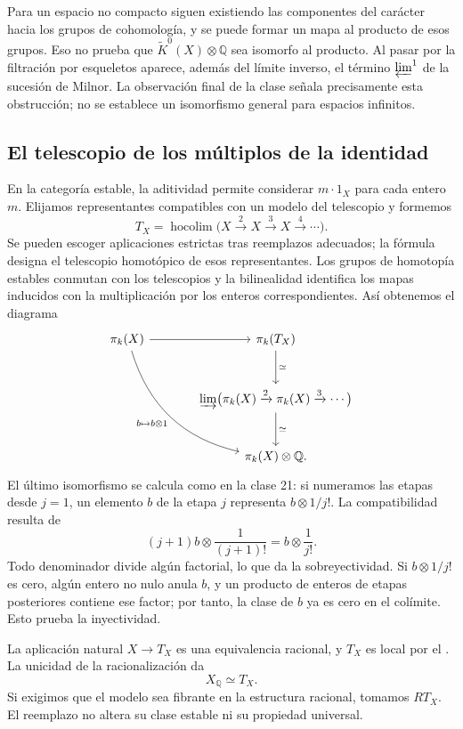 Para un espacio no compacto siguen existiendo las componentes del carácter hacia los grupos de cohomología, y se puede formar un mapa al producto de esos grupos. Eso no prueba que $\widetilde K^0(X)\otimes\mathbb Q$ sea isomorfo al producto. Al pasar por la filtración por esqueletos aparece, además del límite inverso, el término $\varprojlim^1$ de la sucesión de Milnor. La observación final de la clase señala precisamente esta obstrucción; no se establece un isomorfismo general para espacios infinitos.

\subsection{El telescopio de los múltiplos de la identidad}
En la categoría estable, la aditividad permite considerar $m\cdot1_X$ para cada entero $m$. Elijamos representantes compatibles con un modelo del telescopio y formemos
\[
T_X=\operatorname*{hocolim}\bigl(X\xrightarrow{\ 2\ }X
\xrightarrow{\ 3\ }X\xrightarrow{\ 4\ }\cdots\bigr).
\]
Se pueden escoger aplicaciones estrictas tras reemplazos adecuados; la fórmula designa el telescopio homotópico de esos representantes. Los grupos de homotopía estables conmutan con los telescopios y la bilinealidad identifica los mapas inducidos con la multiplicación por los enteros correspondientes. Así obtenemos el diagrama
\[
\begin{tikzcd}[column sep=large,row sep=large]
\pi_k(X)\arrow[r]\arrow[ddr,bend right=30,"b\mapsto b\otimes1"']
&\pi_k(T_X)\arrow[d,"\simeq"]\\
&\displaystyle\varinjlim\bigl(\pi_k(X)\xrightarrow{2}\pi_k(X)
\xrightarrow{3}\cdots\bigr)\arrow[d,"\simeq"]\\
&\pi_k(X)\otimes\mathbb Q.
\end{tikzcd}
\]
El último isomorfismo se calcula como en la clase 21: si numeramos las etapas desde $j=1$, un elemento $b$ de la etapa $j$ representa $b\otimes1/j!$. La compatibilidad resulta de
\[
(j+1)b\otimes\frac1{(j+1)!}=b\otimes\frac1{j!}.
\]
Todo denominador divide algún factorial, lo que da la sobreyectividad. Si $b\otimes1/j!$ es cero, algún entero no nulo anula $b$, y un producto de enteros de etapas posteriores contiene ese factor; por tanto, la clase de $b$ ya es cero en el colímite. Esto prueba la inyectividad.

La aplicación natural $X\to T_X$ es una equivalencia racional, y $T_X$ es local por el . La unicidad de la racionalización da
\[
X_{\mathbb Q}\simeq T_X.
\]
Si exigimos que el modelo sea fibrante en la estructura racional, tomamos $RT_X$. El reemplazo no altera su clase estable ni su propiedad universal.

